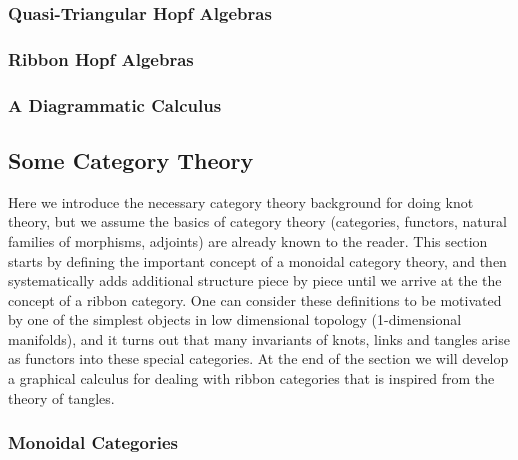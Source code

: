\subsubsection{Quasi-Triangular Hopf Algebras}
\label{Quasi-Triangular Hopf Algebras}


\subsubsection{Ribbon Hopf Algebras}
\label{Ribbon Hopf Algebras}


\subsubsection{A Diagrammatic Calculus}
\label{A Diagrammatic Calculus}








\newpage
\subsection{Some Category Theory}
\label{Some Category Theory}


Here we introduce the necessary category theory background for doing knot theory, but we assume the basics of category theory (categories, functors, natural families of morphisms, adjoints) are already known to the reader. This section starts by defining the important concept of a monoidal category theory, and then systematically adds additional structure piece by piece until we arrive at the the concept of a ribbon category. One can consider these definitions to be motivated by one of the simplest objects in low dimensional topology (1-dimensional manifolds), and it turns out that many invariants of knots, links and tangles arise as functors into these special categories. At the end of the section we will develop a graphical calculus for dealing with ribbon categories that is inspired from the theory of tangles.

\subsubsection{Monoidal Categories}
\label{Monoidal Categories}

